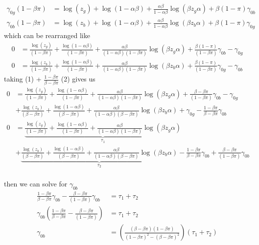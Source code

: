 \documentclass[12pt]{article}
\begin{document}
\begin{enumerate}
\begin{align*}
	\gamma_{0g} (1 - \beta \pi ) &= \log(z_g)  + \log(1 - \alpha \beta  ) + \frac{\alpha \beta}{1 - \alpha \beta} \log (\beta z_g \alpha)  + \beta (1 - \pi) \gamma_{0b} \\
	\gamma_{0b} (1 - \beta \pi ) &= \log(z_b)  + \log(1 - \alpha \beta  ) + \frac{\alpha \beta}{1 - \alpha \beta} \log (\beta z_b \alpha)  + \beta (1 - \pi) \gamma_{0g} 
\end{align*} 
which can be rearranged like
\begin{align}
	0 &= \frac{\log(z_g) }{(1 - \beta \pi )} + \frac{\log(1 - \alpha \beta  )}{(1 - \beta \pi )} + \frac{\alpha \beta}{(1 - \alpha \beta)(1 - \beta \pi )} \log (\beta z_g \alpha)  + \frac{\beta (1 - \pi)}{(1 - \beta \pi )} \gamma_{0b} - \gamma_{0g} \\
	0 &= \frac{\log(z_b) }{(1 - \beta \pi )} + \frac{\log(1 - \alpha \beta  )}{(1 - \beta \pi )} + \frac{\alpha \beta}{(1 - \alpha \beta)(1 - \beta \pi )} \log (\beta z_b \alpha)  + \frac{\beta (1 - \pi)}{(1 - \beta \pi )} \gamma_{0g} - \gamma_{0b} 
\end{align} 
taking  (1) + $\frac{1 - \beta \pi}{\beta - \beta \pi}$ (2)
gives us
\begin{align*}
	0 &= \frac{\log(z_g) }{(1 - \beta \pi )} + \frac{\log(1 - \alpha \beta  )}{(1 - \beta \pi )} + \frac{\alpha \beta}{(1 - \alpha \beta)(1 - \beta \pi )} \log (\beta z_g \alpha)  + \frac{\beta - \beta \pi }{(1 - \beta \pi )} \gamma_{0b} - \gamma_{0g} \\
	  &+ \frac{\log(z_b) }{( \beta - \beta \pi )} + \frac{\log(1 - \alpha \beta  )}{( \beta - \beta \pi )} + \frac{\alpha \beta}{(1 - \alpha \beta)( \beta - \beta \pi )} \log (\beta z_b \alpha)  + \gamma_{0g} - \frac{1 - \beta \pi}{\beta - \beta \pi} \gamma_{0b} \\
	0 &= \underbrace{\frac{\log(z_g) }{(1 - \beta \pi )} + \frac{\log(1 - \alpha \beta  )}{(1 - \beta \pi )} + \frac{\alpha \beta}{(1 - \alpha \beta)(1 - \beta \pi )} \log (\beta z_g \alpha)}_{\tau_1} \\ 
	  &+ \underbrace{\frac{\log(z_b) }{( \beta - \beta \pi )} + \frac{\log(1 - \alpha \beta  )}{( \beta - \beta \pi )} + \frac{\alpha \beta}{(1 - \alpha \beta)( \beta - \beta \pi )} \log (\beta z_b \alpha)}_{\tau_2}  - \frac{1 - \beta \pi}{\beta - \beta \pi} \gamma_{0b} + \frac{\beta - \beta \pi }{(1 - \beta \pi )} \gamma_{0b} \\
\end{align*} 


then we can solve for $\gamma_{0b}$ 
\begin{align*}
	\frac{1 - \beta \pi}{\beta - \beta \pi} \gamma_{0b} - \frac{\beta - \beta \pi }{(1 - \beta \pi )} \gamma_{0b} &= \tau_1 + \tau_2 \\
	\gamma_{0b} \left(\frac{1 - \beta \pi}{\beta - \beta \pi} - \frac{\beta - \beta \pi }{(1 - \beta \pi )} \right) &= \tau_1 + \tau_2 \\
	\gamma_{0b} &= \left(\frac{(\beta - \beta \pi)(1 - \beta \pi)}{(1 - \beta \pi)^2 - (\beta - \beta \pi)^2} \right) (\tau_1 + \tau_2 )\\
\end{align*} 


\end{enumerate}
\end{document}
